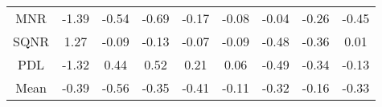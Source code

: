\documentclass[11pt,a4paper]{report}
\begin{document}
\begin{longtable}{ | c || c | c | c | c | c | c | c || c |}
MNR &  \cellcolor[HTML]{FFDFDF} -1.39 &  \cellcolor[HTML]{FFEFEF} -0.54 &  \cellcolor[HTML]{FFEFEF} -0.69 &  \cellcolor[HTML]{FFF7F7} -0.17 &  \cellcolor[HTML]{FFFFFF} -0.08 &  \cellcolor[HTML]{FFFFFF} -0.04 &  \cellcolor[HTML]{FFF7F7} -0.26 &  \cellcolor[HTML]{FFF7F7} -0.45 \\
SQNR &  \cellcolor[HTML]{DFDFFF} 1.27 &  \cellcolor[HTML]{FFFFFF} -0.09 &  \cellcolor[HTML]{FFFFFF} -0.13 &  \cellcolor[HTML]{FFFFFF} -0.07 &  \cellcolor[HTML]{FFFFFF} -0.09 &  \cellcolor[HTML]{FFEFEF} -0.48 &  \cellcolor[HTML]{FFF7F7} -0.36 &  \cellcolor[HTML]{FFFFFF} 0.01 \\
PDL &  \cellcolor[HTML]{FFDFDF} -1.32 &  \cellcolor[HTML]{F7F7FF} 0.44 &  \cellcolor[HTML]{EFEFFF} 0.52 &  \cellcolor[HTML]{F7F7FF} 0.21 &  \cellcolor[HTML]{FFFFFF} 0.06 &  \cellcolor[HTML]{FFEFEF} -0.49 &  \cellcolor[HTML]{FFF7F7} -0.34 &  \cellcolor[HTML]{FFFFFF} -0.13 \\
\hline
\hline
Mean  &  \cellcolor[HTML]{FFF7F7} -0.39 &  \cellcolor[HTML]{FFEFEF} -0.56 &  \cellcolor[HTML]{FFF7F7} -0.35 &  \cellcolor[HTML]{FFF7F7} -0.41 &  \cellcolor[HTML]{FFFFFF} -0.11 &  \cellcolor[HTML]{FFF7F7} -0.32 &  \cellcolor[HTML]{FFF7F7} -0.16 &  \cellcolor[HTML]{FFF7F7} -0.33 \\
\hline
\end{longtable}
\end{document}
